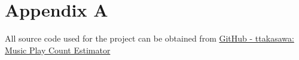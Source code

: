 \section*{Appendix A}
All source code used for the project can be obtained from \href{https://github.com/ttakasawa/Music_Play_Count_Estimator}{GitHub - ttakasawa: Music Play Count Estimator}